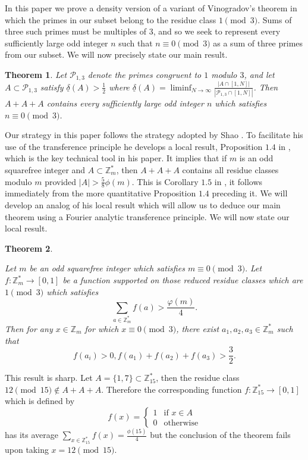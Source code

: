\documentclass[a4paper,11pt,twoside]{amsart}
\newtheorem{theorem}{Theorem}[section]
\theoremstyle{definition}
\numberwithin{equation}{section}
\newcommand\Z{\mathbb{Z}}
\begin{document}
In this paper we prove a density version of a variant of Vinogradov's theorem in which the primes in our subset belong to the residue class $1 \pmod{3}.$ Sums of three such primes must be multiples of $3$, and so we seek to represent every sufficiently large odd integer $n$ such that $n \equiv 0 \pmod{3}$ as a sum of three primes from our subset. We will now precisely state our main result.
\begin{theorem}\label{density-prime-1/2}
Let $\mathcal{P}_{1 , 3}$ denote the primes congruent to $1$ modulo $3$, and let $A \subset \mathcal{P}_{1,3}$ satisfy $\underline{\delta}(A) > \frac{1}{2}$ where $\underline{\delta}(A) = \liminf_{N \rightarrow \infty}{\frac{|A \cap [1,N]|}{|\mathcal{P}_{1,3} \cap [1,N]|}}$. Then $A+A+A$ contains every sufficiently large odd integer $n$ which satisfies $n \equiv 0 \pmod{3}$.
\end{theorem}

Our strategy in this paper follows the strategy adopted by Shao \cite{Shao}. To facilitate his use of the transference principle he develops a local result, Proposition $1.4$ in \cite{Shao}, which is the key technical tool in his paper. It implies that if $m$ is an odd squarefree integer and $A \subset \Z_m^*$, then $A+A+A$ contains all residue classes modulo $m$ provided $|A| > \frac{5}{8}\phi(m).$ This is Corollary $1.5$ in \cite{Shao}, it follows immediately from the more quantitative Proposition $1.4$ preceding it.  We will develop an analog of his local result which will allow us to deduce our main theorem using a Fourier analytic transference principle. We will now state our local result.


\begin{theorem}\label{local-result}


Let $m$ be an odd squarefree integer which satisfies $m \equiv 0 \pmod{3}.$ Let $f:\Z_{m}^* \rightarrow [0,1]$ be a function supported on those reduced residue classes which are $1 \pmod3$ which satisfies $$\sum_{a \in \Z_m^*}f(a) > \frac{\varphi(m)}{4}.$$ Then for any $x \in \Z_m$ for which $x \equiv 0 \pmod 3$, there exist $a_1,a_2,a_3 \in \Z_m^*$ such that $$f(a_i) > 0, f(a_1) + f(a_2) + f(a_3) > \frac{3}{2}.$$

\end{theorem}

This result is sharp. Let $A = \{1,7\} \subset \Z_{15}^*$, then the residue class $12 \pmod{15} \notin A+A+A.$ Therefore the corresponding function $f:\Z_{15}^* \rightarrow [0,1]$ which is defined by $$f(x)=
\begin{cases}
 1&\text{if }  x \in A \\
      0 &\text{otherwise}
\end{cases}
$$
has its average $\sum_{x \in \Z_{15}^*}f(x) = \frac{\phi(15)}{4}$ but the conclusion of the theorem fails upon taking $x = 12\pmod{15}.$
\end{document}
